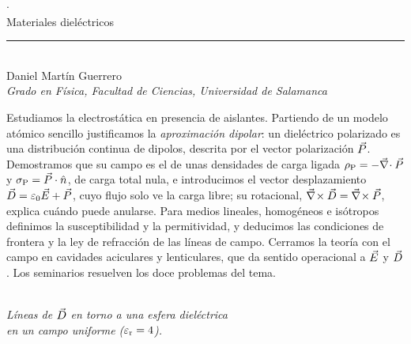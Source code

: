 \hacerportada

\thispagestyle{empty}
\begin{center}
  {\small\color{tenue}\quad$\cdot$\quad{}}\\[1.6em]
  {\fuentetitulo\fontsize{21}{25}\selectfont Materiales dieléctricos}\\[0.9em]
  {\color{acentoA}\rule{2.6cm}{0.6pt}}\\[1.1em]
  {\large Daniel Martín Guerrero}\\[0.3em]
  {\small\itshape\color{tenue} Grado en Física, Facultad de Ciencias, Universidad de Salamanca}
\end{center}
\vspace{1.6em}

\noindent
\begin{minipage}[t]{0.63\textwidth}
\small
{\color{acentoA}}\enspace
Estudiamos la electrostática en presencia de aislantes. Partiendo de un modelo atómico sencillo
justificamos la \emph{aproximación dipolar}: un dieléctrico polarizado es una distribución continua de
dipolos, descrita por el vector polarización $\vec P$. Demostramos que su campo es el de unas densidades de
carga ligada $\rho_{\mathrm P}=-\vec\nabla\!\cdot\vec P$ y $\sigma_{\mathrm P}=\vec P\cdot\hat n$, de carga total nula, e introducimos el vector
desplazamiento $\vec D=\varepsilon_0\vec E+\vec P$, cuyo flujo solo ve la carga libre; su rotacional, $\vec\nabla\!\times\vec D=\vec\nabla\!\times\vec P$,
explica cuándo puede anularse. Para medios lineales, homogéneos e isótropos definimos la susceptibilidad
y la permitividad, y deducimos las condiciones de frontera y la ley de refracción de las líneas de campo.
Cerramos la teoría con el campo en cavidades aciculares y lenticulares, que da sentido operacional a $\vec E$
y $\vec D$. Los seminarios resuelven los doce problemas del tema.
\end{minipage}\hfill
\begin{minipage}[t]{0.33\textwidth}\centering\vspace{-0.6em}
\\[-0.2em]
{\scriptsize\color{tenue}\itshape Líneas de $\vec D$ en torno a una esfera dieléctrica\\ en un campo uniforme ($\varepsilon_{\mathrm r}=4$).}
\end{minipage}

